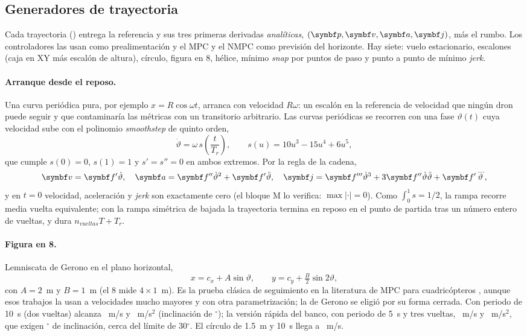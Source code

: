 \subsection{Generadores de trayectoria}

Cada trayectoria () entrega la referencia y sus tres
primeras derivadas \emph{analíticas}, $(\vect p,\vect v,\vect a,\vect j)$,
más el rumbo. Los controladores las usan como prealimentación y el MPC y el
NMPC como previsión del horizonte. Hay siete: vuelo estacionario,
escalones (caja en XY más escalón de altura), círculo, figura en 8, hélice,
mínimo \emph{snap} por puntos de paso y punto a punto de mínimo
\emph{jerk}.

\paragraph{Arranque desde el reposo.} Una curva periódica pura, por ejemplo
$x=R\cos\omega t$, arranca con velocidad $R\omega$: un escalón en la
referencia de velocidad que ningún dron puede seguir y que contaminaría las
métricas con un transitorio arbitrario. Las curvas periódicas se recorren
con una fase $\vartheta(t)$ cuya velocidad sube con el polinomio
\emph{smoothstep} de quinto orden,
\begin{equation}
\dot\vartheta=\omega\,s\!\left(\frac{t}{T_r}\right),\qquad s(u)=10u^3-15u^4+6u^5,
\label{eq:smooth}
\end{equation}
que cumple $s(0)=0$, $s(1)=1$ y $s'=s''=0$ en ambos extremos. Por la regla
de la cadena,
\begin{equation}
\vect v=\vect f'\dot\vartheta,\quad
\vect a=\vect f''\dot\vartheta^2+\vect f'\ddot\vartheta,\quad
\vect j=\vect f'''\dot\vartheta^3+3\vect f''\dot\vartheta\ddot\vartheta+\vect f'\dddot\vartheta,
\end{equation}
y en $t=0$ velocidad, aceleración y \emph{jerk} son exactamente cero (el
bloque M lo verifica: $\max|\cdot|=0$). Como $\int_0^1s=1/2$, la rampa recorre
media vuelta equivalente; con la rampa simétrica de bajada la trayectoria
termina en reposo en el punto de partida tras un número entero de vueltas,
y dura $n_{vueltas}T+T_r$.

\paragraph{Figura en 8.} Lemniscata de Gerono en el plano horizontal,
\begin{equation}
x=c_x+A\sin\vartheta,\qquad y=c_y+\tfrac{B}{2}\sin2\vartheta,
\label{eq:gerono}
\end{equation}
con $A=2$~m y $B=1$~m (el 8 mide $4\times1$~m). Es la prueba clásica de
seguimiento en la literatura de MPC para cuadricópteros
\cite{torrente21,sun22}, aunque esos trabajos la usan a velocidades mucho
mayores y con otra parametrización; la de Gerono se eligió por su forma
cerrada. Con periodo de 10~s (dos vueltas) alcanza ~m/s y
~m/s$^2$ (inclinación de $^\circ$); la versión rápida
del banco, con periodo de 5~s y tres vueltas, ~m/s y
~m/s$^2$, que exigen $^\circ$ de inclinación, cerca del
límite de 30$^\circ$. El círculo de 1.5~m y 10~s llega a ~m/s.

